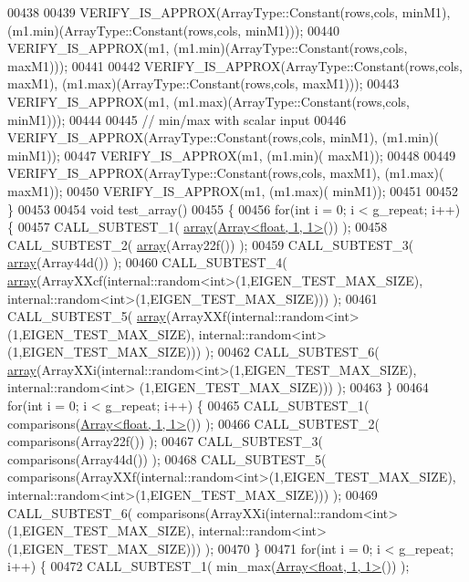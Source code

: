 \begin{DoxyCode}
00438 
00439   VERIFY\_IS\_APPROX(ArrayType::Constant(rows,cols, minM1), (m1.min)(ArrayType::Constant(rows,cols, minM1)));
00440   VERIFY\_IS\_APPROX(m1, (m1.min)(ArrayType::Constant(rows,cols, maxM1)));
00441 
00442   VERIFY\_IS\_APPROX(ArrayType::Constant(rows,cols, maxM1), (m1.max)(ArrayType::Constant(rows,cols, maxM1)));
00443   VERIFY\_IS\_APPROX(m1, (m1.max)(ArrayType::Constant(rows,cols, minM1)));
00444 
00445   \textcolor{comment}{// min/max with scalar input}
00446   VERIFY\_IS\_APPROX(ArrayType::Constant(rows,cols, minM1), (m1.min)( minM1));
00447   VERIFY\_IS\_APPROX(m1, (m1.min)( maxM1));
00448 
00449   VERIFY\_IS\_APPROX(ArrayType::Constant(rows,cols, maxM1), (m1.max)( maxM1));
00450   VERIFY\_IS\_APPROX(m1, (m1.max)( minM1));
00451 
00452 \}
00453 
00454 \textcolor{keywordtype}{void} test\_array()
00455 \{
00456   \textcolor{keywordflow}{for}(\textcolor{keywordtype}{int} i = 0; i < g\_repeat; i++) \{
00457     CALL\_SUBTEST\_1( \hyperlink{class_eigen_1_1array}{array}(\hyperlink{group___core___module_class_eigen_1_1_array}{Array<float, 1, 1>}()) );
00458     CALL\_SUBTEST\_2( \hyperlink{class_eigen_1_1array}{array}(Array22f()) );
00459     CALL\_SUBTEST\_3( \hyperlink{class_eigen_1_1array}{array}(Array44d()) );
00460     CALL\_SUBTEST\_4( \hyperlink{class_eigen_1_1array}{array}(ArrayXXcf(internal::random<int>(1,EIGEN\_TEST\_MAX\_SIZE), 
      internal::random<int>(1,EIGEN\_TEST\_MAX\_SIZE))) );
00461     CALL\_SUBTEST\_5( \hyperlink{class_eigen_1_1array}{array}(ArrayXXf(internal::random<int>(1,EIGEN\_TEST\_MAX\_SIZE), internal::random<int>
      (1,EIGEN\_TEST\_MAX\_SIZE))) );
00462     CALL\_SUBTEST\_6( \hyperlink{class_eigen_1_1array}{array}(ArrayXXi(internal::random<int>(1,EIGEN\_TEST\_MAX\_SIZE), internal::random<int>
      (1,EIGEN\_TEST\_MAX\_SIZE))) );
00463   \}
00464   \textcolor{keywordflow}{for}(\textcolor{keywordtype}{int} i = 0; i < g\_repeat; i++) \{
00465     CALL\_SUBTEST\_1( comparisons(\hyperlink{group___core___module_class_eigen_1_1_array}{Array<float, 1, 1>}()) );
00466     CALL\_SUBTEST\_2( comparisons(Array22f()) );
00467     CALL\_SUBTEST\_3( comparisons(Array44d()) );
00468     CALL\_SUBTEST\_5( comparisons(ArrayXXf(internal::random<int>(1,EIGEN\_TEST\_MAX\_SIZE), 
      internal::random<int>(1,EIGEN\_TEST\_MAX\_SIZE))) );
00469     CALL\_SUBTEST\_6( comparisons(ArrayXXi(internal::random<int>(1,EIGEN\_TEST\_MAX\_SIZE), 
      internal::random<int>(1,EIGEN\_TEST\_MAX\_SIZE))) );
00470   \}
00471   \textcolor{keywordflow}{for}(\textcolor{keywordtype}{int} i = 0; i < g\_repeat; i++) \{
00472     CALL\_SUBTEST\_1( min\_max(\hyperlink{group___core___module_class_eigen_1_1_array}{Array<float, 1, 1>}()) );

\end{DoxyCode}
